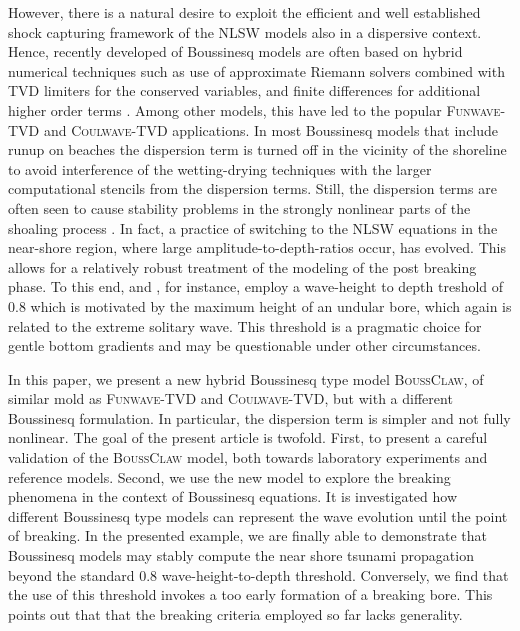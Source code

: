 \documentclass[review]{elsarticle}
\newcommand{\BoussClaw}{\textsc{BoussClaw} }
\newcommand{\BoussClawt}{\textsc{BoussClaw}}
\begin{document}
However, there is a natural desire to exploit the efficient and well established shock capturing framework of the NLSW models also in a dispersive context.
Hence, recently developed of  Boussinesq models are often based on hybrid numerical techniques
such as use of approximate Riemann solvers combined with TVD limiters for the conserved variables, and finite differences
for additional higher order terms \citep{Erduran2005,Kim2009,Shiach:2009,Roeber:2010,Dutykh:2011,shi2012high}. Among other models, this have led to the popular
\textsc{Funwave-TVD} and \textsc{Coulwave-TVD} applications. 
In most Boussinesq models that include runup on beaches the dispersion term
is turned off in the vicinity of the shoreline to avoid interference of
the wetting-drying techniques with the
larger computational stencils from the dispersion terms. Still,
the dispersion terms are often seen to cause stability problems in
the strongly nonlinear parts of the shoaling process \citep{Lovholt:2013a}.
In fact, a practice of  
switching to the NLSW equations in the near-shore region, where large amplitude-to-depth-ratios occur, has evolved.
This allows for a relatively robust treatment of the modeling of the post breaking phase. To this end, \cite{tonelli2009hybrid} and \cite{shi2012high}, for instance, employ a wave-height to depth treshold of $0.8$  which is motivated by the maximum 
height of an undular bore, which again is related to the extreme solitary wave.
This threshold is a pragmatic choice for gentle   bottom gradients and
may be questionable under other circumstances.  

In this paper, we present a new hybrid Boussinesq type model \BoussClawt, 
of similar mold as \textsc{Funwave-TVD} and \textsc{Coulwave-TVD}, but with a different Boussinesq formulation. In particular, the dispersion term is simpler
and not fully nonlinear. The goal of the present article is twofold.
First, to present a careful validation of the \BoussClaw model, both towards  
laboratory experiments and reference models. Second, we use the new model
to explore the breaking phenomena in the context of Boussinesq equations.
It is investigated how different Boussinesq type models 
can represent the wave evolution until the point of breaking. In the presented example,
we are finally able to demonstrate that Boussinesq models may stably
compute the near shore tsunami propagation beyond the standard $0.8$ wave-height-to-depth threshold.
Conversely, we find that the use of this threshold  
invokes a too early formation of a breaking bore. This points out that  
that the breaking criteria employed so far lacks generality.
\end{document}
